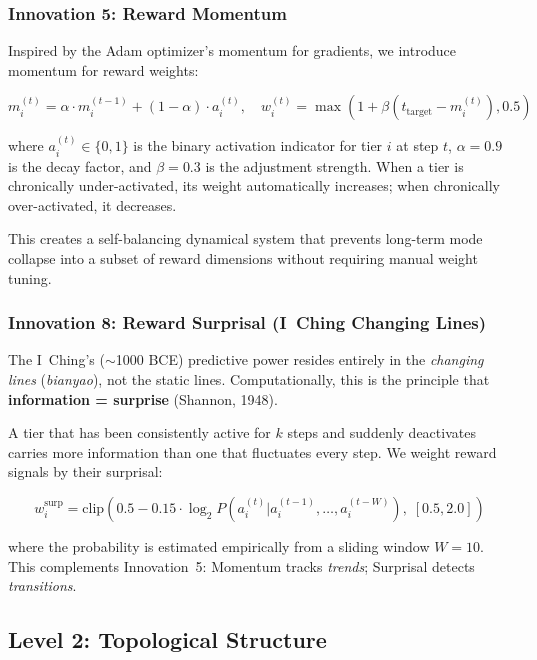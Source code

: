 \documentclass{article}
\begin{document}
\subsubsection{Innovation 5: Reward Momentum}

Inspired by the Adam optimizer's momentum for gradients, we introduce momentum for reward weights:

\begin{equation}
    m_i^{(t)} = \alpha \cdot m_i^{(t-1)} + (1-\alpha) \cdot a_i^{(t)}, \quad w_i^{(t)} = \max\left(1 + \beta(t_{\text{target}} - m_i^{(t)}), 0.5\right)
\end{equation}

where $a_i^{(t)} \in \{0, 1\}$ is the binary activation indicator for tier $i$ at step $t$, $\alpha = 0.9$ is the decay factor, and $\beta = 0.3$ is the adjustment strength. When a tier is chronically under-activated, its weight automatically increases; when chronically over-activated, it decreases.

This creates a self-balancing dynamical system that prevents long-term mode collapse into a subset of reward dimensions without requiring manual weight tuning.

\subsubsection{Innovation 8: Reward Surprisal (I~Ching Changing Lines)}

The I~Ching's ($\sim$1000 BCE) predictive power resides entirely in the \emph{changing lines} (\emph{bianyao}), not the static lines. Computationally, this is the principle that \textbf{information = surprise} (Shannon, 1948).

A tier that has been consistently active for $k$ steps and suddenly deactivates carries more information than one that fluctuates every step. We weight reward signals by their surprisal:

\begin{equation}
    w_i^{\text{surp}} = \text{clip}\left(0.5 - 0.15 \cdot \log_2 P(a_i^{(t)} | a_i^{(t-1)}, \ldots, a_i^{(t-W)}), \; [0.5, 2.0]\right)
\end{equation}

where the probability is estimated empirically from a sliding window $W = 10$. This complements Innovation~5: Momentum tracks \emph{trends}; Surprisal detects \emph{transitions}.

\subsection{Level 2: Topological Structure}
\end{document}
